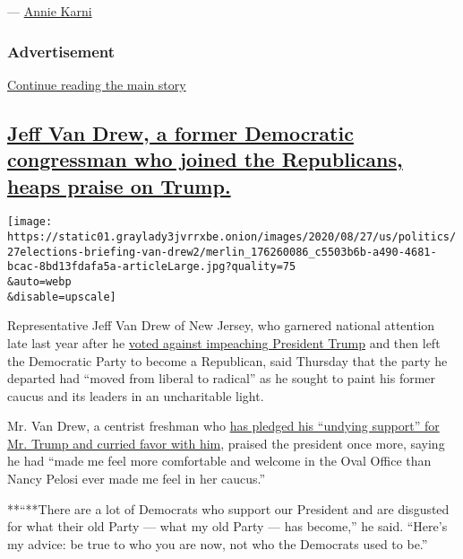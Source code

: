 --- \href{https://www.nytimes3xbfgragh.onion/by/annie-karni}{Annie
Karni}

\hypertarget{advertisement-6}{%
\subsubsection{Advertisement}\label{advertisement-6}}

\protect\hyperlink{after-dfp-ad-mid7}{Continue reading the main story}

\hypertarget{jeff-van-drew-a-former-democratic-congressman-who-joined-the-republicans-heaps-praise-on-trump}{%
\subsection{\texorpdfstring{\protect\hyperlink{jeff-van-drew-a-former-democratic-congressman-who-joined-the-republicans-heaps-praise-on-trump}{Jeff
Van Drew, a former Democratic congressman who joined the Republicans,
heaps praise on
Trump.}}{Jeff Van Drew, a former Democratic congressman who joined the Republicans, heaps praise on Trump.}}\label{jeff-van-drew-a-former-democratic-congressman-who-joined-the-republicans-heaps-praise-on-trump}}

\texttt{[image: https://static01.graylady3jvrrxbe.onion/images/2020/08/27/us/politics/27elections-briefing-van-drew2/merlin\_176260086\_c5503b6b-a490-4681-bcac-8bd13fdafa5a-articleLarge.jpg?quality=75\\\&auto=webp\\\&disable=upscale]}

Representative Jeff Van Drew of New Jersey, who garnered national
attention late last year after he
\href{https://www.nytimes3xbfgragh.onion/2019/10/31/us/politics/who-voted-against-impeachment.html}{voted
against impeaching President Trump} and then left the Democratic Party
to become a Republican, said Thursday that the party he departed had
``moved from liberal to radical'' as he sought to paint his former
caucus and its leaders in an uncharitable light.

Mr. Van Drew, a centrist freshman who
\href{https://www.nytimes3xbfgragh.onion/2019/12/19/us/politics/jeff-van-drew-trump.html}{has
pledged his ``undying support'' for Mr. Trump and curried favor with
him}, praised the president once more, saying he had ``made me feel more
comfortable and welcome in the Oval Office than Nancy Pelosi ever made
me feel in her caucus.''

**``**There are a lot of Democrats who support our President and are
disgusted for what their old Party --- what my old Party --- has
become,'' he said. ``Here's my advice: be true to who you are now, not
who the Democrats used to be.''

